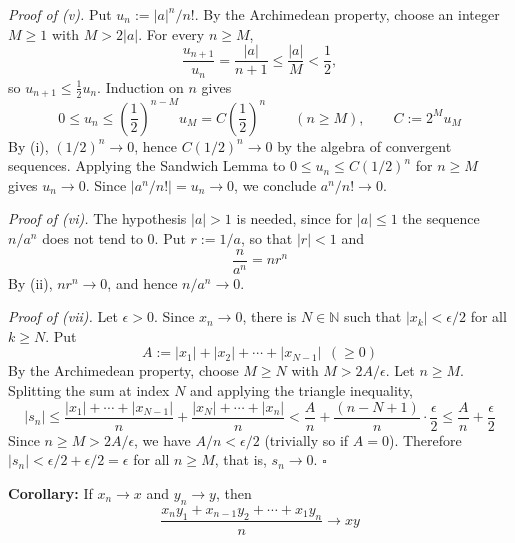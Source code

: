 \documentclass[a4paper,11pt,abstracton]{scrartcl}
\newcommand{\NN}{\mathbb{N}}
\theoremstyle{dotlessP}
\theoremstyle{dotlessS}
\theoremstyle{remark}
\theoremstyle{definition}
\begin{document}
\begin{claim_box}
\textit{Proof of (v).}
Put $u_n:=|a|^n/n!$. By the Archimedean property, choose an integer $M\ge1$ with $M>2|a|$. For every $n\ge M$,
\[
    \frac{u_{n+1}}{u_n}=\frac{|a|}{n+1}\le\frac{|a|}M<\frac12,
\]
so $u_{n+1}\le\frac12u_n$. Induction on $n$ gives
\[
    0\le u_n\le\left(\frac12\right)^{n-M}u_M=C\left(\frac12\right)^n
    \qquad(n\ge M),\qquad C:=2^Mu_M
\]
By (i), $(1/2)^n\to0$, hence $C(1/2)^n\to0$ by the algebra of convergent sequences. Applying the Sandwich Lemma to $0\le u_n\le C(1/2)^n$ for $n\ge M$ gives $u_n\to0$. Since $|a^n/n!|=u_n\to0$, we conclude $a^n/n!\to0$.

\textit{Proof of (vi).}
The hypothesis $|a|>1$ is needed, since for $|a|\le1$ the sequence $n/a^n$ does not tend to $0$. Put $r:=1/a$, so that $|r|<1$ and
\[
    \frac n{a^n}=nr^n
\]
By (ii), $nr^n\to0$, and hence $n/a^n\to0$.

\textit{Proof of (vii).}
Let $\epsilon>0$. Since $x_n\to0$, there is $N\in\NN$ such that $|x_k|<\epsilon/2$ for all $k\ge N$. Put
\[
    A:=|x_1|+|x_2|+\cdots+|x_{N-1}|\ \ (\ge0)
\]
By the Archimedean property, choose $M\ge N$ with $M>2A/\epsilon$. Let $n\ge M$. Splitting the sum at index $N$ and applying the triangle inequality,
\[
    |s_n|\le\frac{|x_1|+\cdots+|x_{N-1}|}n+\frac{|x_N|+\cdots+|x_n|}n
    <\frac An+\frac{(n-N+1)}n\cdot\frac\epsilon2
    \le\frac An+\frac\epsilon2
\]
Since $n\ge M>2A/\epsilon$, we have $A/n<\epsilon/2$ (trivially so if $A=0$). Therefore $|s_n|<\epsilon/2+\epsilon/2=\epsilon$ for all $n\ge M$, that is, $s_n\to0$.
\hfill$\square$
\end{claim_box}

\begin{problem_box}
\textbf{Corollary:}
If $x_n\to x$ and $y_n\to y$, then
\[
    \frac{x_ny_1+x_{n-1}y_2+\cdots+x_1y_n}{n}\rightarrow xy
\]
\end{problem_box}
\end{document}
